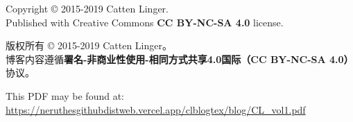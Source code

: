 \documentclass[11pt,a4paper]{report}
\date{2015-2019}
\newcommand{\volid}[0]{1}
\begin{document}
\begin{titlepage}
	\maketitle
\end{titlepage}

\tableofcontents
\clearpage












\cleardoublepage
\pagestyle{empty}
\hspace{1pt}
\vfill
{}\small

Copyright \copyright{} 2015-2019 Catten Linger.\\
Published with Creative Commons \textbf{CC BY-NC-SA 4.0} license.

版权所有 \copyright{} 2015-2019 Catten Linger。\\
博客内容遵循\textbf{署名-非商业性使用-相同方式共享4.0国际（CC BY-NC-SA 4.0）}协议。

This PDF may be found at:\\
\href{https://neruthesgithubdistweb.vercel.app/clblogtex/blog/CL\_vol\volid.pdf}{\ttfamily\footnotesize https://neruthesgithubdistweb.vercel.app/clblogtex/blog/CL\_vol\volid{}.pdf}
\end{document}
